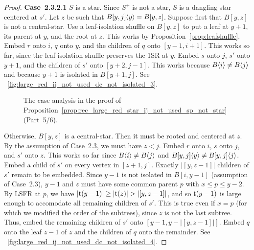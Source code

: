 \documentclass[11pt,a4paper,colorlinks=true,urlcolor=blue,citecolor=red]{article}
\theoremstyle{plain}
\newcommand{\case}[1]{\par\vspace{.5\baselineskip}\noindent\textbf{\sffamily Case~#1}}
\begin{document}
\begin{proof}
  \case{2.3.2.1} $S$ is a star. Since $S^+$ is not a star, $S$ is a
  dangling star centered at $s'$. Let $z$ be such that
  $B{[y,j]}\langle{y}\rangle=B[y,z]$. Suppose first that $B[y,z]$ is not a
  central-star. Use a leaf-isolation shuffle on $B[y,z]$ to put a leaf
  at $y+1$, its parent at $y$, and the root at $z$. This works by
  Proposition~\ref{prop:leafshuffle}. Embed $r$ onto $i$, $q$ onto $y$,
  and the children of $q$ onto $[y-1,i+1]$. This works so far, since the
  leaf-isolation shuffle preserves the 1SR at $y$. Embed $s$ onto $j$,
  $s'$ onto $y+1$, and the children of $s'$ onto $[y+2,j-1]$. This works
  because $B\langle{i}\rangle\neq B\langle{j}\rangle$ and because $y+1$ is isolated in
  $B[y+1,j]$. See
  \figurename~\ref{fig:large_red_ij_not_used_dc_not_isolated_3}.

  \begin{figure}
    \centering\hfil {}\hfil {}\hfil {}\hfil {}\hfil \caption{The case analysis in the proof of
      Proposition~\ref{prop:rec_large_red_star_ij_not_used_sp_not_star}~(Part~5/6).}
  \end{figure}

  Otherwise, $B[y,z]$ is a central-star. Then it must be rooted and
  centered at $z$. By the assumption of Case~2.3, we must have $z<j$.
  Embed $r$ onto $i$, $s$ onto $j$, and $s'$ onto $z$. This works so far
  since $B\langle{i}\rangle\neq B\langle{j}\rangle$ and
  $B{[y,j]}\langle{y}\rangle\neq B{[y,j]}\langle{j}\rangle$. Embed a child of $s'$ on
  every vertex in $[z+1,j]$. Exactly $|[y,z-1]|$ children of $s'$ remain
  to be embedded. Since $y-1$ is not isolated in $B[i,y-1]$ (assumption
  of Case~2.3), $y-1$ and $z$ must have some common parent $p$ with
  $x\leq p\leq y-2$. By LSFR at $p$, we have
  $|\tr(y-1)|\geq|\tr(z)|>|[y,z-1]|$, and so $\mathrm t(y-1)$ is large enough to
  accomodate all remaining children of $s'$. This is true even if $x=p$
  (for which we modified the order of the subtrees), since $z$ is not
  the last subtree. Thus, embed the remaining children of $s'$ onto
  $[y-1,y-|[y,z-1]|]$. Embed $q$ onto the leaf $z-1$ of $z$ and the
  children of $q$ onto the remainder. See
  \figurename~\ref{fig:large_red_ij_not_used_dc_not_isolated_4}.


\end{proof}
\end{document}

